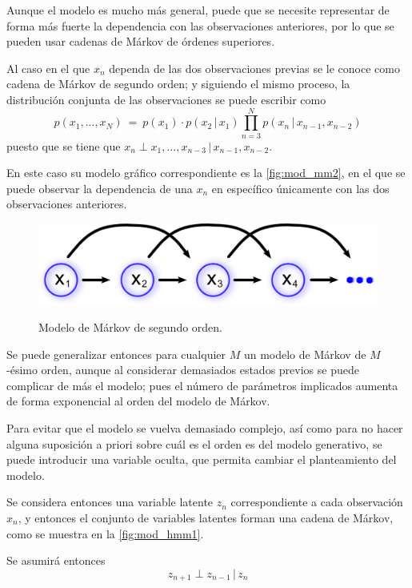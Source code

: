 Aunque el modelo es mucho más general, puede que se necesite representar de forma más fuerte la dependencia con las observaciones anteriores, por lo que se pueden usar cadenas de Márkov de órdenes superiores.

Al caso en el que $x_n$ dependa de las dos observaciones previas se le conoce como cadena de Márkov de segundo orden; y siguiendo el mismo proceso, la distribución conjunta de las observaciones se puede escribir como 
\begin{equation}
\label{eqn:2-5}
p(x_1, ..., x_N) ~=~ p(x_1) \cdot p(x_2 \,|\, x_1) 
        \prod_{n=3}^N p(x_n \,|\, x_{n-1}, x_{n-2})
\end{equation}
puesto que se tiene que $x_n \perp x_1, ..., x_{n-3} \,|\, x_{n-1}, x_{n-2}$.

En este caso su modelo gráfico correspondiente es la \autoref{fig:mod_mm2}, en el que se puede observar la dependencia de una $x_n$ en específico únicamente con las dos observaciones anteriores.

\begin{figure}[tp]
        \myfloatalign
        {\includegraphics[width=0.6\linewidth]{gfx/chap3/mod-mm2}}
        \caption{Modelo de Márkov de segundo orden.}
        \label{fig:mod_mm2}
\end{figure}

Se puede generalizar entonces para cualquier $M$ un modelo de Márkov de $M$-ésimo orden, aunque al considerar demasiados estados previos se puede complicar de más el modelo; pues el número de parámetros implicados aumenta de forma exponencial al orden del modelo de Márkov.

Para evitar que el modelo se vuelva demasiado complejo, así como para no hacer alguna suposición a priori sobre cuál es el orden es del modelo generativo, se puede introducir una variable oculta, que permita cambiar el planteamiento del modelo. 

Se considera entonces una variable latente $z_n$ correspondiente a cada  observación $x_n$, y entonces el conjunto de variables latentes forman una cadena de Márkov, como se muestra en la \autoref{fig:mod_hmm1}.

Se asumirá entonces 
\begin{equation}
\label{eqn:2-6}
z_{n+1} \perp z_{n-1} \,|\, z_{n}
\end{equation}

